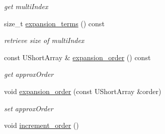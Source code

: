 \begin{DoxyCompactItemize}
\begin{DoxyCompactList}\small\item\em get multi\+Index \end{DoxyCompactList}\item 
size\+\_\+t \hyperlink{classPecos_1_1SharedOrthogPolyApproxData_a1472574cce875722141b69b4eb629572}{expansion\+\_\+terms} () const \label{classPecos_1_1SharedOrthogPolyApproxData_a1472574cce875722141b69b4eb629572}

\begin{DoxyCompactList}\small\item\em retrieve size of multi\+Index \end{DoxyCompactList}\item 
const U\+Short\+Array \& \hyperlink{classPecos_1_1SharedOrthogPolyApproxData_abc949acf051db1e5e72b4a149a437b5c}{expansion\+\_\+order} () const \label{classPecos_1_1SharedOrthogPolyApproxData_abc949acf051db1e5e72b4a149a437b5c}

\begin{DoxyCompactList}\small\item\em get approx\+Order \end{DoxyCompactList}\item 
void \hyperlink{classPecos_1_1SharedOrthogPolyApproxData_a9309d2ffa3c6269251397210894e5f0f}{expansion\+\_\+order} (const U\+Short\+Array \&order)\label{classPecos_1_1SharedOrthogPolyApproxData_a9309d2ffa3c6269251397210894e5f0f}

\begin{DoxyCompactList}\small\item\em set approx\+Order \end{DoxyCompactList}\item 
void \hyperlink{classPecos_1_1SharedOrthogPolyApproxData_aa7513b7e266f32dbcf966a244fd4c89a}{increment\+\_\+order} ()\label{classPecos_1_1SharedOrthogPolyApproxData_aa7513b7e266f32dbcf966a244fd4c89a}


\end{DoxyCompactItemize}
